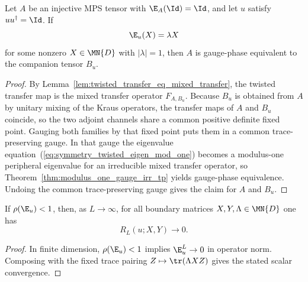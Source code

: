 \begin{theorem}%
    \label{thm:twisted_transfer_modulus_one_gauge_phase}
    \leanok
    Let $A$ be an injective MPS tensor with $\E_A(\Id)=\Id$, and let $u$
    satisfy $u u^\dagger = \Id$.
    If
    \begin{equation}\label{eq:symmetry_twisted_eigen_mod_one}
        \E_u(X) = \lambda X
    \end{equation}
    for some nonzero $X \in \MN{D}$ with $|\lambda|=1$, then $A$ is
    gauge-phase equivalent to the companion tensor $B_u$.
\end{theorem}

\begin{proof}
    \leanok
    By Lemma~\ref{lem:twisted_transfer_eq_mixed_transfer}, the twisted transfer
    map is the mixed transfer operator $F_{A,B_u}$.
    Because $B_u$ is obtained from $A$ by unitary mixing of the Kraus operators,
    the transfer maps of $A$ and $B_u$ coincide, so the two adjoint channels
    share a common positive definite fixed point.
    Gauging both families by that fixed point puts them in a common
    trace-preserving gauge.
    In that gauge the eigenvalue equation~(\ref{eq:symmetry_twisted_eigen_mod_one})
    becomes a modulus-one peripheral
    eigenvalue for an irreducible mixed transfer operator, so
    Theorem~\ref{thm:modulus_one_gauge_irr_tp} yields gauge-phase equivalence.
    Undoing the common trace-preserving gauge gives the claim for $A$ and $B_u$.
\end{proof}

\begin{lemma}%
    \label{lem:boundary_string_order_tendsto_zero}
    \leanok
    If $\rho(\E_u) < 1$, then, as $L \to \infty$, for all boundary matrices
    $X,Y,\Lambda \in \MN{D}$ one has
    \[
        R_L(u;X,Y) \longrightarrow 0.
    \]
\end{lemma}

\begin{proof}
    \leanok
    In finite dimension, $\rho(\E_u) < 1$ implies $\E_u^L \to 0$ in operator
    norm. Composing with the fixed trace pairing
    $Z \mapsto \tr(\Lambda X Z)$ gives the stated scalar convergence.
\end{proof}

